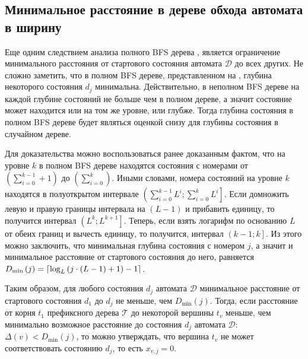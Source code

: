 
\subsection{Минимальное расстояние в дереве обхода автомата в ширину}
\label{sec:space:pruning:bfs-distance}

Еще одним следствием анализа полного BFS дерева , является ограничение минимального расстояния от стартового состояния автомата $\mathcal{D}$ до всех других.
Не сложно заметить, что в полном BFS дереве, представленном на , глубина некоторого состояния $d_{j}$ минимальна.
Действительно, в неполном BFS дереве на каждой глубине состояний не больше чем в полном дереве, а значит состояние может находится или на том же уровне, или глубже. 
Тогда глубина состояния в полном BFS дереве будет являться оценкой снизу для глубины состояния в случайном дереве.

Для доказательства можно воспользоваться ранее доказанным фактом, что на уровне $k$ в полном BFS дереве находятся состояния с номерами от $\left(\sum_{i = 0}^{k - 1} + 1\right)$ до $\left(\sum_{i = 0}^{k}\right)$.
Иными словами, номера состояний на уровне $k$ находятся в полуоткрытом интервале $\left(\sum_{i = 0}^{k - 1}L^{i};\sum_{i = 0}^{k}L^{i}\right]$.
Если домножить левую и правую границы интервала на $(L - 1)$ и прибавить единицу, то получится интервал $\left(L^{k};L^{k + 1}\right]$.
Теперь, если взять логарифм по основанию $L$ от обеих границ и вычесть единицу, то получится, интервал $\left(k - 1; k\right]$.
Из этого можно заключить, что минимальная глубина состояния с номером $j$, а значит и минимальное расстояние от стартового состояния до него, равняется $D_{\min}\left(j\right) = \ceil*{\log_{L}\left(j \cdot \left(L - 1\right) + 1\right) - 1}$.

Таким образом, для любого состояния $d_{j}$ автомата $\mathcal{D}$ минимальное расстояние от стартового состояния $d_{1}$ до $d_{j}$ не меньше, чем $D_{\min}\left(j\right)$. 
Тогда, если расстояние от корня $t_{1}$ префиксного дерева $\mathcal{T}$ до некоторой вершины $t_{v}$ меньше, чем минимально возможное расстояние до состояния $d_{j}$ автомата $\mathcal{D}$: $\Delta\left(v\right) < D_{\min}\left(j\right)$, то можно утверждать, что вершина $t_{v}$ не может соответствовать состоянию $d_{j}$, то есть $x_{v,j} = 0$.


